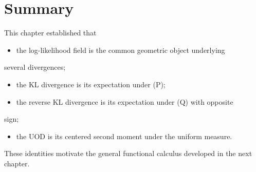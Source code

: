 \section{Summary}
This chapter established that
\begin{itemize}
  \item the log-likelihood field is the common geometric object underlying
\end{itemize}
    several divergences;
\begin{itemize}
  \item the KL divergence is its expectation under (P);
  \item the reverse KL divergence is its expectation under (Q) with opposite
\end{itemize}
    sign;
\begin{itemize}
  \item the UOD is its centered second moment under the uniform measure.
\end{itemize}
These identities motivate the general functional calculus developed in
the next chapter.
